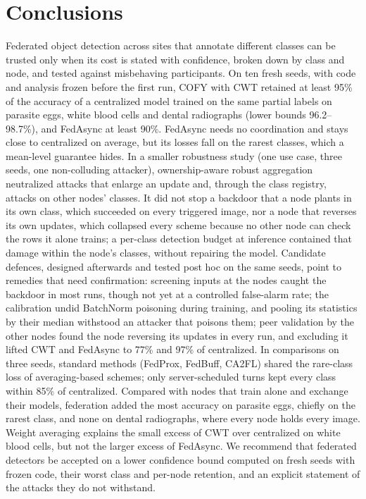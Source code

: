 \documentclass[pdflatex,sn-mathphys-num]{sn-jnl}
\newcommand{\sys}{COFY}
\begin{document}
\section{Conclusions}\label{sec:conclusion}
Federated object detection across sites that annotate different classes can be trusted only when its cost is stated with confidence, broken down by class and node, and tested against misbehaving participants. On ten fresh seeds, with code and analysis frozen before the first run, \sys{} with CWT retained at least 95\% of the accuracy of a centralized model trained on the same partial labels on parasite eggs, white blood cells and dental radiographs (lower bounds 96.2--98.7\%), and FedAsync at least 90\%. FedAsync needs no coordination and stays close to centralized on average, but its losses fall on the rarest classes, which a mean-level guarantee hides. In a smaller robustness study (one use case, three seeds, one non-colluding attacker), ownership-aware robust aggregation neutralized attacks that enlarge an update and, through the class registry, attacks on other nodes' classes. It did not stop a backdoor that a node plants in its own class, which succeeded on every triggered image, nor a node that reverses its own updates, which collapsed every scheme because no other node can check the rows it alone trains; a per-class detection budget at inference contained that damage within the node's classes, without repairing the model. Candidate defences, designed afterwards and tested post hoc on the same seeds, point to remedies that need confirmation: screening inputs at the nodes caught the backdoor in most runs, though not yet at a controlled false-alarm rate; the calibration undid BatchNorm poisoning during training, and pooling its statistics by their median withstood an attacker that poisons them; peer validation by the other nodes found the node reversing its updates in every run, and excluding it lifted CWT and FedAsync to 77\% and 97\% of centralized. In comparisons on three seeds, standard methods (FedProx, FedBuff, CA2FL) shared the rare-class loss of averaging-based schemes; only server-scheduled turns kept every class within 85\% of centralized. Compared with nodes that train alone and exchange their models, federation added the most accuracy on parasite eggs, chiefly on the rarest class, and none on dental radiographs, where every node holds every image. Weight averaging explains the small excess of CWT over centralized on white blood cells, but not the larger excess of FedAsync. We recommend that federated detectors be accepted on a lower confidence bound computed on fresh seeds with frozen code, their worst class and per-node retention, and an explicit statement of the attacks they do not withstand.
\end{document}
